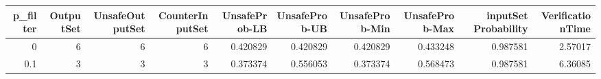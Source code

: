 \begin{tabular}{rrrrrrrrrr}
\hline
   p\_filter &   OutputSet &   UnsafeOutputSet &   CounterInputSet &   UnsafeProb-LB &   UnsafeProb-UB &   UnsafeProb-Min &   UnsafeProb-Max &   inputSet Probability &   VerificationTime \\
\hline
        0   &           6 &                 6 &                 6 &        0.420829 &        0.420829 &         0.420829 &         0.433248 &               0.987581 &            2.57017 \\
        0.1 &           3 &                 3 &                 3 &        0.373374 &        0.556053 &         0.373374 &         0.568473 &               0.987581 &            6.36085 \\
\hline
\end{tabular}
